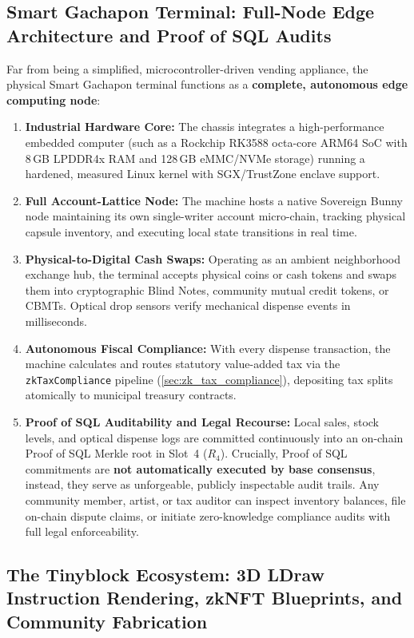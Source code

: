 \documentclass[a4paper,11pt,twoside,parskip=half-,headings=small]{scrartcl}
\newcommand{\code}[1]{\texttt{#1}}
\begin{document}
\subsection{Smart Gachapon Terminal: Full-Node Edge Architecture and Proof of SQL Audits}
\label{sec:gachapon_full_node}

Far from being a simplified, microcontroller-driven vending appliance, the physical Smart Gachapon terminal functions as a \textbf{complete, autonomous edge computing node}:
\begin{enumerate}
  \item \textbf{Industrial Hardware Core:} The chassis integrates a high-performance embedded computer (such as a Rockchip RK3588 octa-core ARM64 SoC with 8\,GB LPDDR4x RAM and 128\,GB eMMC/NVMe storage) running a hardened, measured Linux kernel with SGX/TrustZone enclave support.
  \item \textbf{Full Account-Lattice Node:} The machine hosts a native Sovereign Bunny node maintaining its own single-writer account micro-chain, tracking physical capsule inventory, and executing local state transitions in real time.
  \item \textbf{Physical-to-Digital Cash Swaps:} Operating as an ambient neighborhood exchange hub, the terminal accepts physical coins or cash tokens and swaps them into cryptographic Blind Notes, community mutual credit tokens, or CBMTs. Optical drop sensors verify mechanical dispense events in milliseconds.
  \item \textbf{Autonomous Fiscal Compliance:} With every dispense transaction, the machine calculates and routes statutory value-added tax via the \code{zkTaxCompliance} pipeline (\cref{sec:zk_tax_compliance}), depositing tax splits atomically to municipal treasury contracts.
  \item \textbf{Proof of SQL Auditability and Legal Recourse:} Local sales, stock levels, and optical dispense logs are committed continuously into an on-chain Proof of SQL Merkle root in Slot~4 ($R_4$). Crucially, Proof of SQL commitments are \textbf{not automatically executed by base consensus}, instead, they serve as unforgeable, publicly inspectable audit trails. Any community member, artist, or tax auditor can inspect inventory balances, file on-chain dispute claims, or initiate zero-knowledge compliance audits with full legal enforceability.
\end{enumerate}

\subsection{The Tinyblock Ecosystem: 3D LDraw Instruction Rendering, zkNFT Blueprints, and Community Fabrication}
\label{sec:tinyblock_ldraw}
\end{document}
